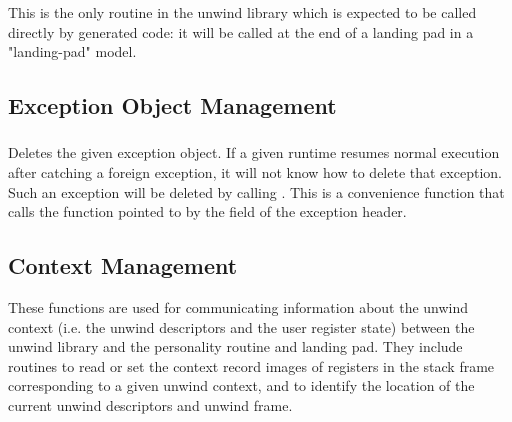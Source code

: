 This is the only routine in the unwind library which is expected
to be called directly by generated code: it will be called at the
end of a landing pad in a "landing-pad" model.

\subsection{Exception Object Management}

\subsubsection{}


Deletes the given exception object. If a given runtime resumes normal
execution after catching a foreign exception, it will not know how to
delete that exception. Such an exception will be deleted by calling
. This is a convenience function that calls
the function pointed to by the  field of the exception
header.

\subsection{Context Management}

These functions are used for communicating information about the unwind
context (i.e. the unwind descriptors and the user register state) between
the unwind library and the personality routine and landing pad. They
include routines to read or set the context record images of registers in
the stack frame corresponding to a given unwind context, and to identify
the location of the current unwind descriptors and unwind frame.

\subsubsection{}



